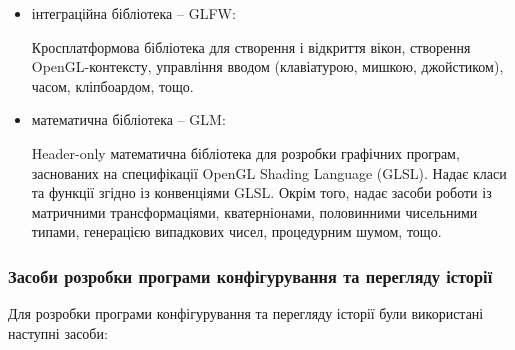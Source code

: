 \begin{itemize}
  \item інтеграційна бібліотека -- GLFW\cite{glfw}:

    Кросплатформова бібліотека для створення і відкриття вікон, створення OpenGL-контексту, управління вводом (клавіатурою, мишкою, джойстиком), часом, кліпбоардом, тощо.

  \item математична бібліотека -- GLM\cite{glm}:

    Header-only математична бібліотека для розробки графічних програм, заснованих на специфікації OpenGL Shading Language (GLSL). Надає класи та функції згідно із конвенціями GLSL. Окрім того, надає засоби роботи із матричними трансформаціями, кватерніонами, половинними чисельними типами, генерацією випадкових чисел, процедурним шумом, тощо.

\end{itemize}

\subsubsection{Засоби розробки програми конфігурування та перегляду історії}

Для розробки програми конфігурування та перегляду історії були використані наступні засоби:

